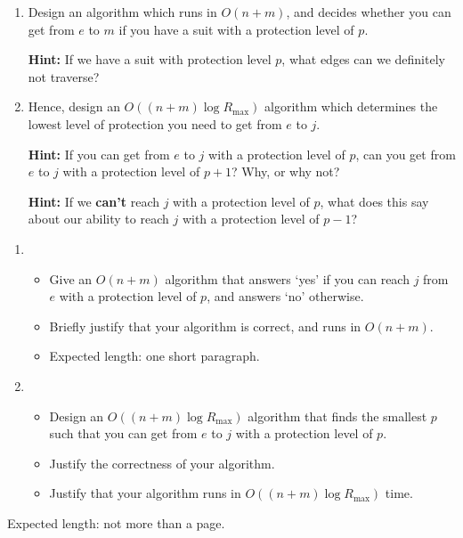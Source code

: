 \documentclass[12pt]{article}
\begin{document}
\begin{question}
\begin{enumerate}
    \item Design an algorithm which runs in $O(n + m)$, and decides whether you can get from $e$ to $m$ if you have a suit with a protection level of $p$.

    \textbf{Hint:} If we have a suit with protection level $p$, what edges can we definitely not traverse? 
    
    \item Hence, design an $O((n+m) \log R_{\max})$ algorithm which determines the lowest level of protection you need to get from $e$ to $j$.

    \textbf{Hint: } If you can get from $e$ to $j$ with a protection level of $p$, can you get from $e$ to $j$ with a protection level of $p+1$? Why, or why not? 
    
    \textbf{Hint: } If we \textbf{can't} reach $j$ with a protection level of $p$, what does this say about our ability to reach $j$ with a protection level of $p-1$?
\end{enumerate}
\end{question}

\begin{rubric}
\begin{enumerate}
    \item \begin{itemize}
        \item Give an $O(n+m)$ algorithm that answers `yes' if you can reach $j$ from $e$ with a protection level of $p$, and answers `no' otherwise.
        \item Briefly justify that your algorithm is correct, and runs in $O(n + m)$.
        \item Expected length: one short paragraph.
    \end{itemize} 
    \item \begin{itemize}
        \item Design an $O((n+m) \log R_{\max})$ algorithm that finds the smallest $p$ such that you can get from $e$ to $j$ with a protection level of $p$.
        \item Justify the correctness of your algorithm.
        \item Justify that your algorithm runs in $O((n+m) \log R_{\max})$ time.
    \end{itemize}
\end{enumerate}
Expected length: not more than a page.
\end{rubric}

\begin{solution}
\end{solution}

\begin{attribution}
\end{attribution}
\end{document}
